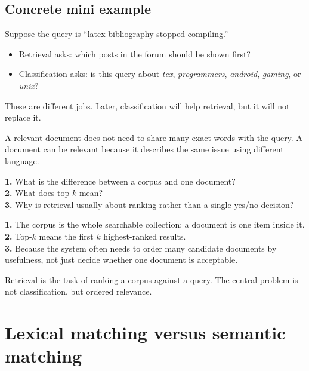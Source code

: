 \documentclass[11pt,oneside]{report}
\begin{document}
\section*{Concrete mini example}
Suppose the query is ``latex bibliography stopped compiling.''
\begin{itemize}
\item Retrieval asks: which posts in the forum should be shown first?
\item Classification asks: is this query about \emph{tex}, \emph{programmers}, \emph{android}, \emph{gaming}, or \emph{unix}?
\end{itemize}
These are different jobs. Later, classification will help retrieval, but it will not replace it.

\begin{warningbox}
A relevant document does not need to share many exact words with the query. A document can be relevant because it describes the same issue using different language.
\end{warningbox}

\begin{selfcheckbox}
\textbf{1.} What is the difference between a corpus and one document?\\
\textbf{2.} What does top-$k$ mean?\\
\textbf{3.} Why is retrieval usually about ranking rather than a single yes/no decision?
\end{selfcheckbox}

\begin{answerbox}
\textbf{1.} The corpus is the whole searchable collection; a document is one item inside it.\\
\textbf{2.} Top-$k$ means the first $k$ highest-ranked results.\\
\textbf{3.} Because the system often needs to order many candidate documents by usefulness, not just decide whether one document is acceptable.
\end{answerbox}

\begin{rememberbox}
Retrieval is the task of ranking a corpus against a query. The central problem is not classification, but ordered relevance.
\end{rememberbox}


\chapter[Lexical vs. Semantic Matching]{Lexical matching versus semantic matching}
\end{document}
